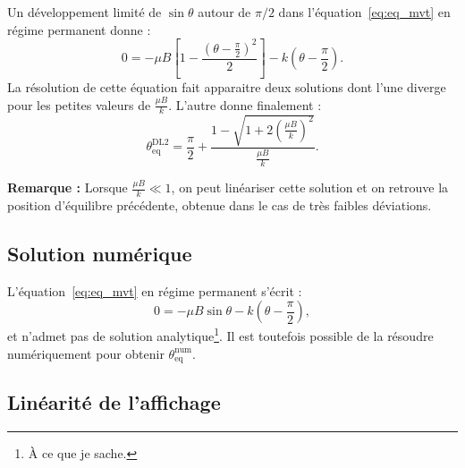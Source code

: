 \documentclass[12pt,a4paper,fleqn]{article}
\begin{document}
Un développement limité de $\sin \theta$ autour de $\pi/2$ dans l'équation~\ref{eq:eq_mvt} en régime permanent donne :
\begin{equation}
0 = - \mu B \left[ 1-\frac{\left(\theta-\frac{\pi}{2}\right)^2}{2} \right] - k\left(\theta-\frac{\pi}{2}\right).
\end{equation}
La résolution de cette équation fait apparaitre deux solutions dont l'une diverge pour les petites valeurs de $\tfrac{\mu B}{k}$.
L'autre donne finalement :
\begin{equation}
\theta_\mathrm{eq}^\mathrm{DL2} = \frac{\pi}{2} + \frac{1-\sqrt{1+2\left(\frac{\mu B}{k}\right)^2}}{\frac{\mu B}{k}}.
\label{eq:sol_2nd}
\end{equation}

\noindent
\textbf{Remarque :}
Lorsque $\frac{\mu B}{k} \ll 1$, on peut linéariser cette solution et on retrouve la position d'équilibre précédente, obtenue dans le cas de très faibles déviations.

\subsection{Solution numérique}

L'équation~\ref{eq:eq_mvt} en régime permanent s'écrit :
\begin{equation}
0 = -\mu B \sin \theta - k\left(\theta-\frac{\pi}{2}\right),
\end{equation}
et n'admet pas de solution analytique\footnote{À ce que je sache.}.
Il est toutefois possible de la résoudre numériquement pour obtenir $\theta_\mathrm{eq}^\mathrm{num}$.

\subsection{Linéarité de l'affichage}
\end{document}

